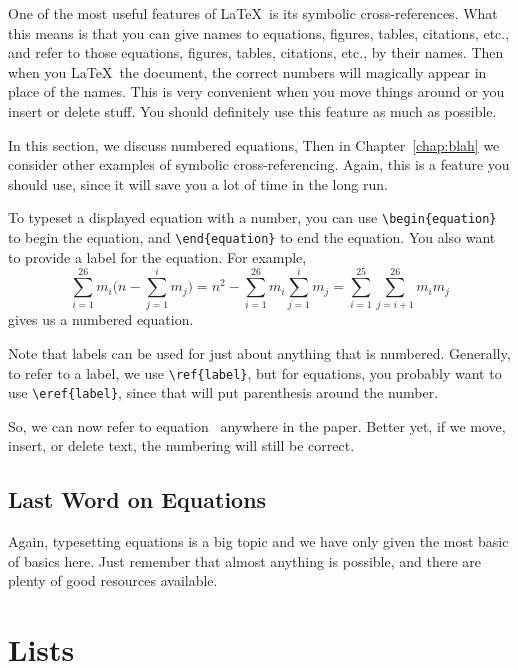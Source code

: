 One of the most useful features of \LaTeX\ is its symbolic cross-references.
What this means is that you can give names to equations, figures, tables, citations, etc., and
refer to those equations, figures, tables, citations, etc., by their names. Then when you \LaTeX\
the document, the correct numbers will magically appear in place of the
names. This is very convenient when you move things around or you insert or delete
stuff. You should definitely use this feature as much as possible.

In this section, we discuss numbered equations, Then in Chapter~\ref{chap:blah}
we consider other examples of symbolic cross-referencing.
Again, this is a feature you should use, since it will save
you a lot of time in the long run.

To typeset a displayed equation with a number, you can 
use \verb+\begin{equation}+ to begin the equation, and \verb+\end{equation}+
to end the equation. You also want to provide a label for the equation.
For example,
\begin{equation}\label{eq:swaps}
  \sum_{i = 1}^{26} m_i \bigg( n - \sum_{j=1}^i m_j \bigg) 
    = n^2 - \sum_{i = 1}^{26} m_i  \sum_{j=1}^i m_j = \sum_{i=1}^{25} \sum_{j=i+1}^{26} m_i m_j 
\end{equation}
gives us a numbered equation. 

Note that labels can be used for
just about anything that is numbered. Generally, to refer to a label,
we use \verb+\ref{label}+, but for equations, you probably want to use
\verb+\eref{label}+, since that will put parenthesis around the number.

So, we can now refer to equation~ anywhere in the paper.
Better yet, if we move, insert, or delete text, the numbering will still be correct.


\subsection{Last Word on Equations}

Again, typesetting equations is a big topic and we have only given the most basic
of basics here. Just remember that almost anything is possible, and there
are plenty of good resources available. 


\section{Lists}

